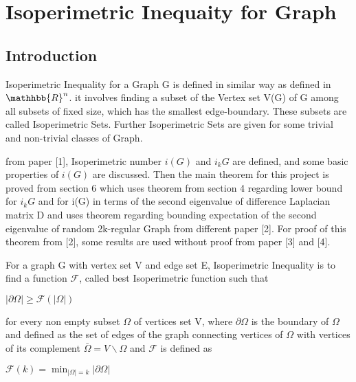 \documentclass[oneside]{book}
\begin{document}
    
    
    
    
    
    
    
    
    
    
    
    
    
    
    
    
    
    
    
    
    
    
    
    
    
    
    
    
    
    
    
    
    
    
    \chapter{Isoperimetric Inequaity for Graph}
    \section{Introduction}
  
 
  Isoperimetric Inequality for a Graph G is defined in similar way as defined in $\mathhbb{R}^n$. it involves finding a subset of the Vertex set V(G) of G among all subsets of fixed size, which has the smallest edge-boundary. These subsets are called Isoperimetric Sets. Further  Isoperimetric Sets are given for some trivial and non-trivial classes of Graph. \par 
    from paper [1], Isoperimetric number $i(G)$ and $i_k{G}$ are defined, and some basic properties of $i(G)$  are discussed. Then the main theorem for this project is proved from section 6 which uses theorem from section 4 regarding lower bound for $i_k{G}$ and for i(G) in terms of the second eigenvalue of difference Laplacian matrix D and uses theorem regarding bounding expectation of the second eigenvalue of random 2k-regular Graph from different paper [2]. For proof of this theorem from [2], some results are used without proof from paper [3] and [4].\par

  

For a graph G with vertex set V and edge set E, Isoperimetric Inequality is to find a function $\mathcal{F}$, called best  Isoperimetric function such that  \begin{center}
  $|\partial \Omega| \geq \mathcal{F}(|\Omega|)$  
\end{center}   
for every non empty subset $\Omega$ of vertices set V, where $\partial \Omega$ is the boundary of $\Omega$  and defined as the set of edges of the graph connecting vertices of $\Omega$ with vertices of its complement $\bar{\Omega} = V \backslash \Omega $ and $\mathcal{F}$ is defined as  \begin{center}
    $\mathscr{F}(k)=\min _{|\Omega|=k}|\partial \Omega|$\par
\end{center} 
\end{document}
